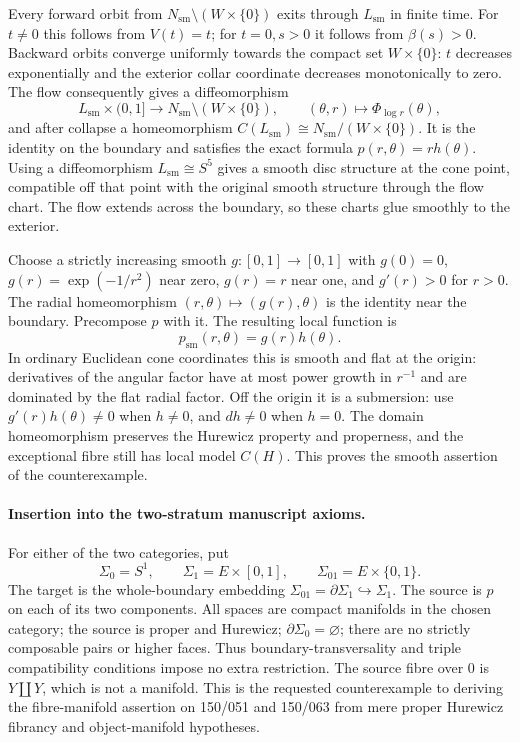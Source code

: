 Every forward orbit from $N_{\mathrm{sm}}\setminus(W\times\{0\})$ exits
through $L_{\mathrm{sm}}$ in finite time.  For $t\ne0$ this follows from
$V(t)=t$; for $t=0,s>0$ it follows from $\beta(s)>0$.
Backward orbits converge uniformly towards the compact set
$W\times\{0\}$: $t$ decreases exponentially and the exterior collar
coordinate decreases monotonically to zero.  The flow consequently gives
a diffeomorphism
\[
 L_{\mathrm{sm}}\times(0,1]\longrightarrow
 N_{\mathrm{sm}}\setminus(W\times\{0\}),\qquad
 (\theta,r)\longmapsto\Phi_{\log r}(\theta),
\]
and after collapse a homeomorphism $C(L_{\mathrm{sm}})\cong
N_{\mathrm{sm}}/(W\times\{0\})$.  It is the identity on the boundary and
satisfies the exact formula $p(r,\theta)=rh(\theta)$.
Using a diffeomorphism $L_{\mathrm{sm}}\cong S^5$ gives a smooth disc
structure at the cone point, compatible off that point with the original
smooth structure through the flow chart.  The flow extends across the
boundary, so these charts glue smoothly to the exterior.

Choose a strictly increasing smooth $g:[0,1]\to[0,1]$ with $g(0)=0$,
$g(r)=\exp(-1/r^2)$ near zero, $g(r)=r$ near one, and $g'(r)>0$ for $r>0$.
The radial homeomorphism $(r,\theta)\mapsto(g(r),\theta)$ is the identity
near the boundary.  Precompose $p$ with it.  The resulting local function
is
\[
 p_{\mathrm{sm}}(r,\theta)=g(r)h(\theta).
 \tag{C5H.9}
\]
In ordinary Euclidean cone coordinates this is smooth and flat at the
origin: derivatives of the angular factor have at most power growth in
$r^{-1}$ and are dominated by the flat radial factor.  Off the origin it
is a submersion: use $g'(r)h(\theta)\ne0$ when $h\ne0$, and $dh\ne0$ when
$h=0$.  The domain homeomorphism preserves the Hurewicz property and
properness, and the exceptional fibre still has local model $C(H)$.
This proves the smooth assertion of the counterexample.

\paragraph{Insertion into the two-stratum manuscript axioms.}
For either of the two categories, put
\[
 \Sigma_0=S^1,\qquad \Sigma_1=E\times[0,1],\qquad
 \Sigma_{01}=E\times\{0,1\}.
\]
The target is the whole-boundary embedding
$\Sigma_{01}=\partial\Sigma_1\hookrightarrow\Sigma_1$.
The source is $p$ on each of its two components.  All spaces are compact
manifolds in the chosen category; the source is proper and Hurewicz;
$\partial\Sigma_0=\varnothing$; there are no strictly composable pairs or
higher faces.  Thus boundary-transversality and triple compatibility
conditions impose no extra restriction.  The source fibre over $0$ is
$Y\amalg Y$, which is not a manifold.  This is the requested counterexample
to deriving the fibre-manifold assertion on 150/051 and 150/063 from mere
proper Hurewicz fibrancy and object-manifold hypotheses.

